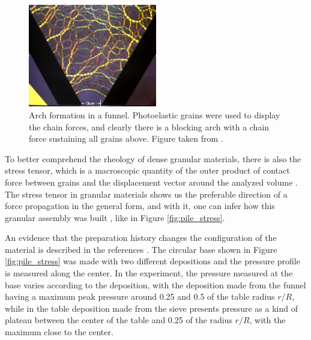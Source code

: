 \begin{figure}
    \centering
    \includegraphics[width=0.5\textwidth]{04-figuras/hopperforcechain.jpg}
    \caption[Arch in a funnel.]{Arch formation in a funnel. Photoelastic grains were used to display the chain forces, and clearly there is a blocking arch with a chain force sustaining all grains above. Figure taken from \cite{Duke_Physics}.}
    \label{fig:arch_chain}
\end{figure}

    To better comprehend the rheology of dense granular materials, there is also the stress tensor, which is a macroscopic quantity of the outer product of contact force between grains and the displacement vector around the analyzed volume \cite{Granular_Physics, Nathalia-Dissertacao, Leticia-Dissertacao, Fabiola-Dissertacao, Force_Chains_Micro_Macro}. The stress tensor in granular materials shows us the preferable direction of a force propagation in the general form, and with it, one can infer how this granular assembly was built \cite{Memories_in_Sand}, like in Figure \ref{fig:pile_stress}.

    An evidence that the preparation history changes the configuration of the material is described in the references \cite{Memories_in_Sand, Sensitivity_of_Stress_Response_Function_to_Packing_Preparation}. The circular base shown in Figure \ref{fig:pile_stress} was made with two different depositions and the pressure profile is measured along the center. In the experiment, the pressure measured at the base varies according to the deposition, with the deposition made from the funnel having a maximum peak pressure around 0.25 and 0.5 of the table radius $r/R$, while in the table deposition made from the sieve presents pressure as a kind of plateau between the center of the table and 0.25 of the radius $r/R$, with the maximum close to the center.

